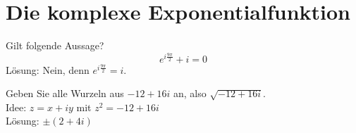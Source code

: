 \section{Die komplexe Exponentialfunktion}
Gilt folgende Aussage?
\begin{displaymath}
  e^{i \frac{9\pi}{2}} + i = 0
\end{displaymath}
Lösung: Nein, denn $e^{i \frac{9\pi}{2}} = i$.

Geben Sie alle Wurzeln aus $-12 + 16i$ an, also $\sqrt{-12 + 16i}$.\\
Idee: $z = x+iy$ mit $z^2 = -12 + 16i$\\
Lösung: $\pm (2 + 4i)$